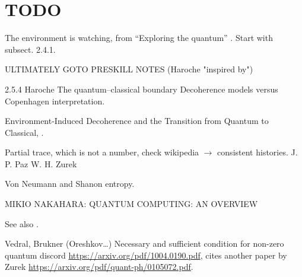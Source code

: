 \section{TODO}

The environment is watching, from ``Exploring the quantum''
\parencite[Ch. 4]{Haroche_Exploring}. Start with subsect. 2.4.1.

ULTIMATELY GOTO PRESKILL NOTES (Haroche "inspired by")

2.5.4 Haroche The quantum–classical boundary
Decoherence models versus Copenhagen interpretation.

Environment-Induced Decoherence and the Transition from Quantum to Classical,
\cite{Zurek_Fundamentals}.

Partial trace, which is not a number, check wikipedia $\rightarrow$ consistent histories.
J. P. Paz W. H. Zurek

Von Neumann and Shanon entropy.

MIKIO NAKAHARA: QUANTUM COMPUTING: AN OVERVIEW

See also \cite{Schlosshauer_Decoherence}.

Vedral, Brukner (Oreshkov\dots)
Necessary and sufficient condition for non-zero quantum discord
\url{https://arxiv.org/pdf/1004.0190.pdf},
cites another paper by Zurek \url{https://arxiv.org/pdf/quant-ph/0105072.pdf}.

